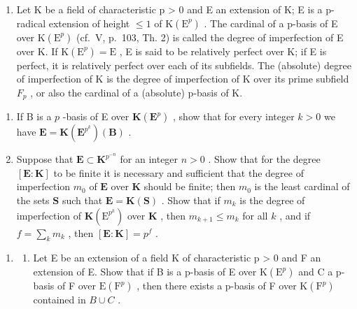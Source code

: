 \BourbakiExerciseGroup

\begin{enumerate}
\def\labelenumi{\arabic{enumi})}
\tightlist
\item
  Let K be a field of characteristic p \textgreater{} 0 and E an extension of K; E is a p-radical extension of height \(\leqslant 1\) of \(\mathrm{K}(\mathrm{E}^{p})\) . The cardinal of a p-basis of E over \(\mathrm{K}(\mathrm{E}^{p})\) (cf.~V, p.~103, Th. 2) is called the degree of imperfection of E over K. If \(\mathrm{K}(\mathrm{E}^{p}) = \mathrm{E}\) , E is said to be relatively perfect over K; if E is perfect, it is relatively perfect over each of its subfields. The (absolute) degree of imperfection of K is the degree of imperfection of K over its prime subfield \(F_{p}\) , or also the cardinal of a (absolute) p-basis of K.
\end{enumerate}

\begin{enumerate}
\def\labelenumi{\alph{enumi})}
\item
  If B is a \(p\) -basis of E over \(\mathbf{K}(\mathbf{E}^p)\) , show that for every integer \(k > 0\) we have \(\mathbf{E} = \mathbf{K}(\mathbf{E}^{p^k})(\mathbf{B})\) .
\item
  Suppose that \(\mathbf{E} \subset \mathbf{K}^{p^{-n}}\) for an integer \(n > 0\) . Show that for the degree \([\mathbf{E}:\mathbf{K}]\) to be finite it is necessary and sufficient that the degree of imperfection \(m_0\) of \(\mathbf{E}\) over \(\mathbf{K}\) should be finite; then \(m_0\) is the least cardinal of the sets \(\mathbf{S}\) such that \(\mathbf{E} = \mathbf{K}(\mathbf{S})\) . Show that if \(m_k\) is the degree of imperfection of \(\mathbf{K}(\mathrm{E}^{p^k})\) over \(\mathbf{K}\) , then \(m_{k + 1} \leqslant m_k\) for all \(k\) , and if \(f = \sum_{k} m_k\) , then \([\mathbf{E}:\mathbf{K}] = p^f\) .
\end{enumerate}

\begin{enumerate}
\def\labelenumi{\arabic{enumi})}
\setcounter{enumi}{1}
\tightlist
\item
  \begin{enumerate}
  \def\labelenumii{\alph{enumii})}
  \tightlist
  \item
    Let E be an extension of a field K of characteristic p \textgreater{} 0 and F an extension of E. Show that if B is a p-basis of E over \(\mathrm{K}(\mathrm{E}^{p})\) and C a p-basis of F over \(\mathrm{E}(\mathrm{F}^{p})\) , then there exists a p-basis of F over \(\mathrm{K}(\mathrm{F}^{p})\) contained in \(B \cup C\) .
  \end{enumerate}
\end{enumerate}

